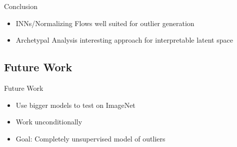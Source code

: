 \documentclass[aspectratio=169]{beamer}
\begin{document}
\begin{frame}{Conclusion}
    \begin{itemize}
        \item INNs/Normalizing Flows well suited for outlier generation
        \item Archetypal Analysis interesting approach for interpretable latent
            space
    \end{itemize}
\end{frame}

\subsection{Future Work}

\begin{frame}{Future Work}
    \begin{itemize}
        \item Use bigger models to test on ImageNet
        \item Work unconditionally
        \item Goal: Completely unsupervised model of outliers
    \end{itemize}
\end{frame}
\end{document}
